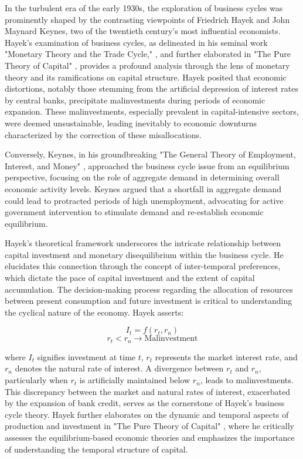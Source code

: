 \documentclass[12pt]{article}
\begin{document}
In the turbulent era of the early 1930s, the exploration of business cycles was prominently shaped by the contrasting
viewpoints of Friedrich Hayek and John Maynard Keynes, two of the twentieth century's most influential economists.
Hayek's examination of business cycles, as delineated in his seminal work "Monetary Theory and the Trade Cycle,"
\cite{Hay33}, and further elaborated in "The Pure Theory of Capital" \cite{Ha41}, provides a profound analysis
through the lens of monetary theory and its ramifications on capital structure. Hayek posited that economic distortions,
notably those stemming from the artificial depression of interest rates by central banks, precipitate malinvestments
during periods of economic expansion. These malinvestments, especially prevalent in capital-intensive sectors, were
deemed unsustainable, leading inevitably to economic downturns characterized by the correction of these misallocations. 

Conversely, Keynes, in his groundbreaking "The General Theory of Employment, Interest, and Money" \cite{Key36},
approached the business cycle issue from an equilibrium perspective, focusing on the role of aggregate demand in
determining overall economic activity levels. Keynes argued that a shortfall in aggregate demand could lead to
protracted periods of high unemployment, advocating for active government intervention to stimulate demand and
re-establish economic equilibrium. 

Hayek's theoretical framework underscores the intricate relationship between capital investment and monetary
disequilibrium within the business cycle. He elucidates this connection through the concept of inter-temporal
preferences, which dictate the pace of capital investment and the extent of capital accumulation. The decision-making
process regarding the allocation of resources between present consumption and future investment is critical to
understanding the cyclical nature of the economy. Hayek asserts: 

\[ I_t = f(r_t, r_n) \]
\[ r_t < r_n \rightarrow \text{Malinvestment} \]

where \( I_t \) signifies investment at time \( t \), \( r_t \) represents the market interest rate, and \( r_n \)
denotes the natural rate of interest. A divergence between \( r_t \) and \( r_n \), particularly when \( r_t \) is
artificially maintained below \( r_n \), leads to malinvestments. This discrepancy between the market and natural rates
of interest, exacerbated by the expansion of bank credit, serves as the cornerstone of Hayek's business cycle theory.
Hayek further elaborates on the dynamic and temporal aspects of production and investment in "The Pure Theory of
Capital" \cite{Ha41}, where he critically assesses the equilibrium-based economic theories and emphasizes the
importance of understanding the temporal structure of capital. 
\end{document}
